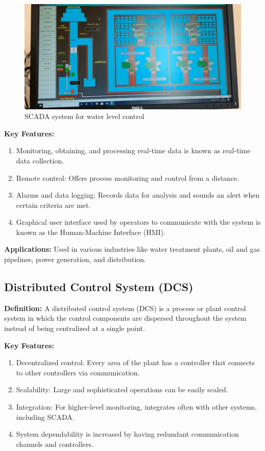 \begin{figure}[h!]
  \centering 
  \includegraphics[width=0.8\linewidth]{figs/control_instrumentation/image10.png}
  \caption{SCADA system for water level control}
  \label{fig:SCADA system for water level control}
\end{figure}

\textbf{Key Features:}

\begin{enumerate}
\item
  Monitoring, obtaining, and processing real-time data is known as
  real-time data collection.
\item
  Remote control: Offers process monitoring and control from a distance.
\item
  Alarms and data logging: Records data for analysis and sounds an alert
  when certain criteria are met.
\item
  Graphical user interface used by operators to communicate with the
  system is known as the Human-Machine Interface (HMI).
\end{enumerate}

\textbf{Applications:} Used in various industries like water treatment
plants, oil and gas pipelines, power generation, and distribution.

\subsection{Distributed Control System (DCS)}

\textbf{Definition:} A distributed control system (DCS) is a process or
plant control system in which the control components are dispersed
throughout the system instead of being centralized at a single point.

\textbf{Key Features:}

\begin{enumerate}
\item
  Decentralized control: Every area of the plant has a controller that
  connects to other controllers via communication.
\item
  Scalability: Large and sophisticated operations can be easily scaled.
\item
  Integration: For higher-level monitoring, integrates often with other
  systems, including SCADA.
\item
  System dependability is increased by having redundant communication
  channels and controllers.
\end{enumerate}

